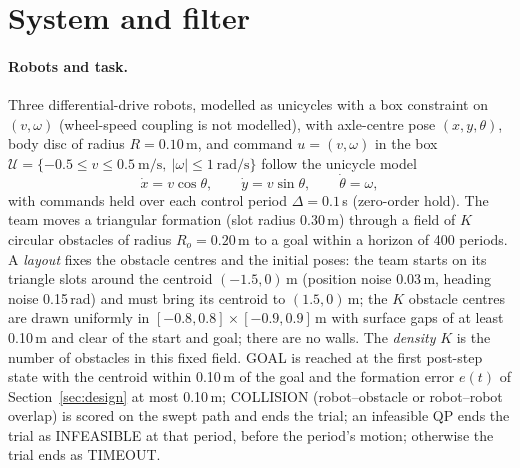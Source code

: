 \documentclass[11pt]{article}
\begin{document}
\section{System and filter}\label{sec:system}
\paragraph{Robots and task.} Three differential-drive robots, modelled as unicycles with a box
constraint on $(v,\omega)$ (wheel-speed coupling is not modelled), with axle-centre pose $(x,y,\theta)$,
body disc of radius $R=0.10$\,m, and command $u=(v,\omega)$ in the box
$\mathcal U=\{-0.5\le v\le 0.5\ \mathrm{m/s},\ |\omega|\le 1\ \mathrm{rad/s}\}$ follow the unicycle model
\begin{equation}
\dot x = v\cos\theta,\qquad \dot y = v\sin\theta,\qquad \dot\theta=\omega ,
\end{equation}
with commands held over each control period $\Delta=0.1$\,s (zero-order hold). The team moves a
triangular formation (slot radius 0.30\,m) through a field of $K$ circular obstacles of radius
$R_o=0.20$\,m to a goal within a horizon of 400 periods. A \emph{layout} fixes the obstacle centres and the
initial poses: the team starts on its triangle slots around the centroid $(-1.5,0)$\,m (position noise
0.03\,m, heading noise 0.15\,rad) and must bring its centroid to $(1.5,0)$\,m; the $K$ obstacle centres
are drawn uniformly in $[-0.8,0.8]\times[-0.9,0.9]$\,m with surface gaps of at least 0.10\,m and clear of
the start and goal; there are no walls. The \emph{density} $K$ is the number of obstacles in this fixed
field. GOAL is reached at the first post-step state with the centroid within 0.10\,m of the goal and the
formation error $e(t)$ of Section~\ref{sec:design} at most 0.10\,m; COLLISION (robot--obstacle or
robot--robot overlap) is scored on the swept path and ends the trial; an infeasible QP ends the trial as
INFEASIBLE at that period, before the period's motion; otherwise the trial ends as TIMEOUT.
\end{document}

